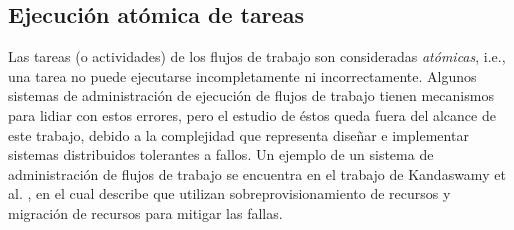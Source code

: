 \subsection{Ejecución atómica de tareas}
Las tareas (o actividades) de los flujos de trabajo son consideradas \emph{atómicas}, i.e., una tarea no puede ejecutarse incompletamente ni incorrectamente. Algunos sistemas de administración de ejecución de flujos de trabajo tienen mecanismos para lidiar con estos errores, pero el estudio de éstos queda fuera del alcance de este trabajo, debido a la complejidad que representa diseñar e implementar sistemas distribuidos tolerantes a fallos. Un ejemplo de un sistema de administración de flujos de trabajo se encuentra en el trabajo de Kandaswamy et al. \cite{kandaswamy2008fault}, en el cual describe que utilizan sobreprovisionamiento de recursos y migración de recursos para mitigar las fallas.










